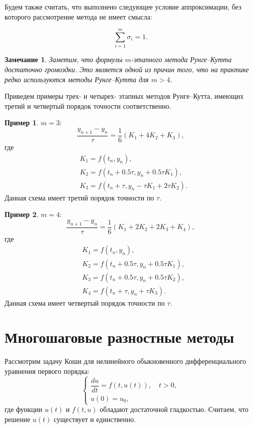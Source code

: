 \documentclass[11pt,a4paper,twoside,listtotoc,bibtotoc]{report}
\numberwithin{equation}{section}
\theoremstyle{definition}
\newtheorem{example}{Пример}[section]
\theoremstyle{plain}
\newtheorem*{note*}{Замечание}
\newcommand{\bigO}[1]{\ensuremath{\operatorname{O}\bigl(#1\bigr)}}
\begin{document}
Будем также считать, что выполнено следующее условие аппроксимации,
без которого рассмотрение метода не имеет смысла:

%
$$
    \sum\limits_{i=1}^{m} \sigma_i = 1.
$$
%
\begin{note*}
%
    Заметим, что формулы $m$-этапного метода Рунге--Кутта достаточно громоздки.
    Это является одной из причин того, что на практике редко используются
    методы Рунге--Кутта для $m > 4$.
%
\end{note*}
%
Приведем примеры трех- и четырех- этапных методов Рунге--Кутта, имеющих третий и
четвертый порядок точности соответственно.
%
\begin{example}
    $m=3$:
    $$
        \dfrac{y_{n+1} - y_n}{\tau} = \frac16(K_1 + 4K_2 + K_3),
    $$
    где
    $$
        \begin{aligned}
            &K_1 = f(t_n, y_n), \\
            &K_2 = f(t_n + 0.5 \tau, y_n + 0.5 \tau K_1), \\
            &K_3 = f(t_n + \tau, y_n - \tau K_1 + 2\tau K_2).
        \end{aligned}
    $$
    Данная схема имеет третий порядок точности по $\tau$.%
\end{example}
%

%
\begin{example}
    $m=4$:
    $$
        \dfrac{y_{n+1} - y_n}{\tau} = \frac16 (K_1 + 2K_2 + 2K_3 + K_4),
    $$
    где
    $$
        \begin{aligned}
            &K_1 = f(t_n, y_n), \\
            &K_2 = f(t_n+0.5\tau, y_n + 0.5\tau K_1), \\
            &K_3 = f(t_n + 0.5 \tau, y_n + 0.5 \tau K_2), \\
            &K_4 = f(t_n + \tau, y_n + \tau K_3).
        \end{aligned}
    $$
    Данная схема имеет четвертый порядок точности по $\tau$.%
\end{example}
%
%
\section{Многошаговые разностные методы}
%
\label{Many_steps}
Рассмотрим задачу Коши для нелинейного обыкновенного дифференциального уравнения
первого порядка:
\begin{equation}
%
    \label{multi_step}
    \begin{cases}
        \dfrac{du}{dt} = f(t, u(t)), \quad t > 0, \\
        u(0) = u_0, %
    \end{cases}
\end{equation}
%
где функции $u(t)$ и $f(t, u)$ обладают достаточной гладкостью. Считаем,
что решение $u(t)$ существует и единственно.
\end{document}
